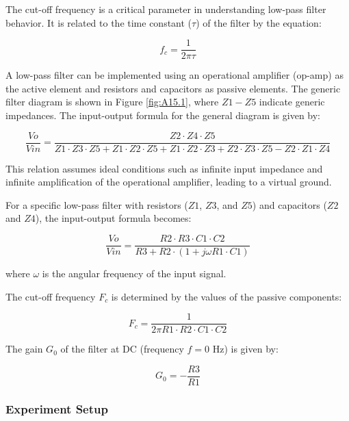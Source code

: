 The cut-off frequency is a critical parameter in understanding low-pass filter behavior. It is related to the time constant (\(\tau\)) of the filter by the equation:

\[
f_c = \frac{1}{2\pi\tau}
\]

A low-pass filter can be implemented using an operational amplifier (op-amp) as the active element and resistors and capacitors as passive elements. The generic filter diagram is shown in Figure \ref{fig:A15.1}, where $Z1-Z5$ indicate generic impedances. The input-output formula for the general diagram is given by:

\begin{equation}
    \frac{Vo}{Vin} = \frac{Z2 \cdot Z4 \cdot Z5}{Z1 \cdot Z3 \cdot Z5 + Z1 \cdot Z2 \cdot Z5 + Z1 \cdot Z2 \cdot Z3 + Z2 \cdot Z3 \cdot Z5 - Z2 \cdot Z1 \cdot Z4}
\end{equation}

This relation assumes ideal conditions such as infinite input impedance and infinite amplification of the operational amplifier, leading to a virtual ground.


For a specific low-pass filter with resistors ($Z1$, $Z3$, and $Z5$) and capacitors ($Z2$ and $Z4$), the input-output formula becomes:

\begin{equation}
    \frac{Vo}{Vin} = \frac{R2 \cdot R3 \cdot C1 \cdot C2}{R3 + R2 \cdot (1 + j \omega R1 \cdot C1)}
\end{equation}

where $\omega$ is the angular frequency of the input signal.

The cut-off frequency $F_c$ is determined by the values of the passive components:

\begin{equation}
    F_c = \frac{1}{2 \pi R1 \cdot R2 \cdot C1 \cdot C2}
\end{equation}

The gain $G_0$ of the filter at DC (frequency $f = 0$ Hz) is given by:

\begin{equation}
    G_0 = -\frac{R3}{R1}
\end{equation}
\subsubsection*{Experiment Setup}

